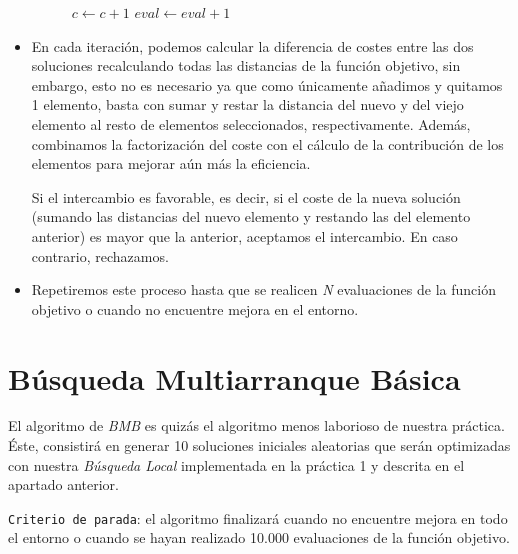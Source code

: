 \begin{itemize}
\begin{figure}[H]
\begin{minipage}{.75\linewidth}
\begin{algorithm}[H]
{{{							
							$c\leftarrow c+1$\;
							$eval\leftarrow eval+1$\;
						}
					}
				}
			\end{algorithm}
		\end{minipage}
	\end{figure}
	
	
\item En cada iteración, podemos calcular la diferencia de costes entre las dos soluciones recalculando todas las distancias de la función objetivo, sin embargo, esto no es necesario ya que como únicamente añadimos y quitamos 1 elemento, basta con sumar y restar la distancia del nuevo y del viejo elemento al resto de elementos seleccionados, respectivamente. Además, combinamos la factorización del coste con el cálculo de la contribución de los elementos para mejorar aún más la eficiencia.



Si el intercambio es favorable, es decir, si el coste de la nueva solución (sumando las distancias del nuevo elemento y restando las del elemento anterior) es mayor que la anterior, aceptamos el intercambio. En caso contrario, rechazamos.

\item Repetiremos este proceso hasta que se realicen \textit{N} evaluaciones de la función objetivo o cuando no encuentre mejora en el entorno.

\end{itemize}








\newpage 
\section{Búsqueda Multiarranque Básica}
\hspace{1.5cm}El algoritmo de \textit{BMB} es quizás el algoritmo menos laborioso de nuestra práctica. Éste, consistirá en generar 10 soluciones iniciales aleatorias que serán optimizadas con nuestra \textit{Búsqueda Local} implementada en la práctica 1 y descrita en el apartado anterior.

\texttt{Criterio de parada}: el algoritmo finalizará cuando no encuentre mejora en todo el entorno o cuando se hayan realizado 10.000 evaluaciones de la función objetivo. \\


